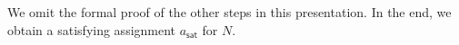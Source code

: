 



We omit the formal proof of the other steps in this presentation. In the end, we obtain a satisfying assignment $a_{\textsf{sat}}$ for $N$. 

